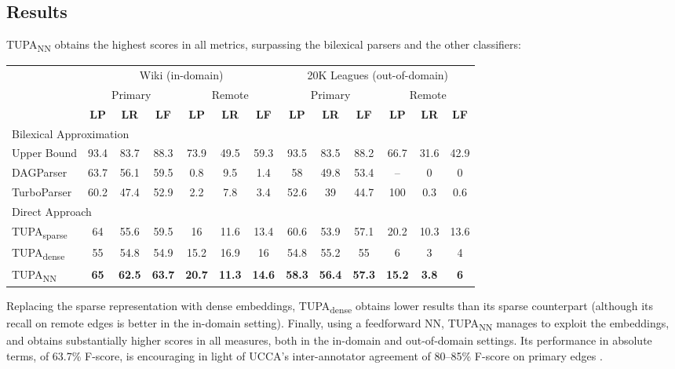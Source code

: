 \documentclass[a0,portrait]{a0poster}
\newcommand{\parser}[1]{TUPA\textsubscript{#1}}
\begin{document}
\begin{multicols}{2}
\section*{Results}

\parser{NN} obtains the highest scores in all metrics, surpassing the bilexical parsers
and the other classifiers:
	  
\begin{center}
	\begin{tabular}{l|ccc|ccc||ccc|ccc}
	& \multicolumn{6}{c||}{Wiki (in-domain)} & \multicolumn{6}{c}{20K Leagues (out-of-domain)} \\
	& \multicolumn{3}{c|}{Primary} & \multicolumn{3}{c||}{Remote}
	& \multicolumn{3}{c|}{Primary} & \multicolumn{3}{c}{Remote} \\
	& \textbf{LP} & \textbf{LR} & \textbf{LF} & \textbf{LP} & \textbf{LR} & \textbf{LF}
	& \textbf{LP} & \textbf{LR} & \textbf{LF} & \textbf{LP} & \textbf{LR} & \textbf{LF} \\
	\hline
	\multicolumn{4}{l}{\rule{0pt}{2ex} \footnotesize Bilexical Approximation} \\
	Upper Bound %
	& 93.4 & 83.7 & 88.3 & 73.9 & 49.5 & 59.3
	& 93.5 & 83.5 & 88.2 & 66.7 & 31.6 & 42.9 \vspace{.1cm} \\
	DAGParser
	& 63.7 & 	56.1	 & 59.5	 & 0.8	 & 9.5	 &  1.4
	& 58	 & 49.8	 & 53.4 & -- & 0 & 0 \\
	TurboParser
	& 60.2	 & 47.4	 & 52.9	 & 2.2	 & 7.8	 &  3.4
	& 52.6	 & 39	 & 44.7	 & 100	 & 0.3	 & 0.6 \\
	\hline
	\multicolumn{4}{l}{\rule{0pt}{2ex} \footnotesize Direct Approach} \\
	\parser{sparse}
	& 64 & 55.6 & 59.5 & 16 & 11.6 & 13.4 
	& 60.6 & 53.9 & 57.1 & 20.2 & 10.3 & 13.6 \\
	\parser{dense} 
	& 55 & 54.8 & 54.9 & 15.2 & 16.9 & 16 
	& 54.8 & 55.2 & 55 & 6 & 3 & 4 \\
	\parser{NN}
	& {\bf 65} & {\bf 62.5} & {\bf 63.7} & {\bf 20.7} & {\bf 11.3} & {\bf 14.6}
	& {\bf 58.3} & {\bf 56.4} & {\bf 57.3} & {\bf 15.2} & {\bf 3.8} & {\bf 6}
	\end{tabular}
\end{center}

Replacing the sparse representation with dense embeddings, \parser{dense} obtains
lower results than its sparse counterpart (although its recall on remote edges is
better in the in-domain setting).
Finally, using a feedforward NN, \parser{NN} manages to exploit the embeddings,
and obtains substantially higher scores in all measures, both
in the in-domain and out-of-domain settings.
Its performance in absolute terms, of 63.7\% F-score, is encouraging in light of
UCCA's inter-annotator agreement of 80--85\%
F-score on primary edges \cite{abend2013universal}.





\end{multicols}
\end{document}
